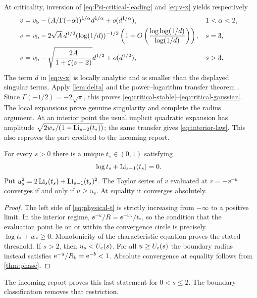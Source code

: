At criticality, inversion of \eqref{eq:Psi-critical-leading} and
\eqref{eq:v-x} yields respectively
\begin{align*}
 v&=v_{\mathrm b}-(A/\Gamma(-\alpha))^{1/\alpha}d^{1/\alpha}
       +o(d^{1/\alpha}),&&1<\alpha<2,\\
 v&=v_{\mathrm b}-2\sqrt A\,d^{1/2}(\log(1/d))^{-1/2}
       \left(1+O\left(\frac{\log\log(1/d)}{\log(1/d)}\right)\right),
       &&s=3,\\
 v&=v_{\mathrm b}-\sqrt{\frac{2A}{1+\zeta(s-2)}}d^{1/2}
       +o(d^{1/2}),&&s>3.
\end{align*}
The term $d$ in \eqref{eq:v-x} is locally analytic and is smaller
than the displayed singular terms.  Apply \cref{lem:delta} and the
power--logarithm transfer theorem \cite{FO}.  Since
$\Gamma(-1/2)=-2\sqrt\pi$, this proves
\eqref{eq:critical-stable}--\eqref{eq:critical-gaussian}.
The local expansions prove genuine singularity and complete the
radius argument.  At an interior point the usual implicit quadratic
expansion has amplitude
$\sqrt{2w_* /(1+\operatorname{Li}_{s-2}(t_*))}$; the same transfer gives
\eqref{eq:interior-law}.  This also reproves the part credited to
the incoming report.

\begin{corollary}
\label{cor:physical}
For every $s>0$ there is a unique $t_s\in(0,1)$ satisfying
\begin{equation}\label{eq:physical-t}
 \log t_s+\operatorname{Li}_{s-1}(t_s)=0.
\end{equation}
Put $u_s^2=2\operatorname{Li}_s(t_s)+\operatorname{Li}_{s-1}(t_s)^2$.
The Taylor series of $v$ evaluated at $r=-\ee^{-u}$ converges if and
only if $u\ge u_s$.  At equality it converges absolutely.
\end{corollary}

\begin{proof}
The left side of \eqref{eq:physical-t} is strictly increasing from
$-\infty$ to a positive limit.  In the interior regime,
$\ee^{-u}/R=\ee^{-w_*}/t_*$, so the condition that the evaluation
point lie on or within the convergence circle is precisely
$\log t_*+w_*\ge0$.  Monotonicity of the characteristic equation
proves the stated threshold.  If $s>2$, then $u_s<U_{\mathrm c}(s)$.
For all $u\ge U_{\mathrm c}(s)$ the boundary radius instead satisfies
$\mathrm e^{-u}/R_{\mathrm b}=\mathrm e^{-b}<1$.  Absolute convergence at equality
follows from \cref{thm:phase}.
\end{proof}

The incoming report proves this last statement for $0<s\le2$.
The boundary classification removes that restriction.

